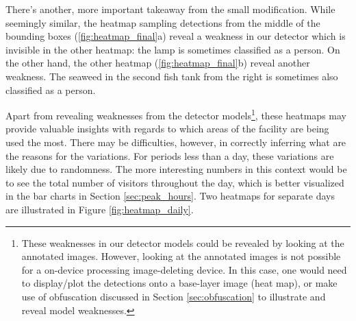 There's another, more important takeaway from the small modification. While seemingly similar, the heatmap sampling detections from the middle of the bounding boxes (\ref{fig:heatmap_final}a) reveal a weakness in our detector which is invisible in the other heatmap: the lamp is sometimes classified as a person. On the other hand, the other heatmap (\ref{fig:heatmap_final}b) reveal another weakness. The seaweed in the second fish tank from the right is sometimes also classified as a person.   

Apart from revealing weaknesses from the detector models\footnote{These weaknesses in our detector models could be revealed by looking at the annotated images. However, looking at the annotated images is not possible for a on-device processing image-deleting device. In this case, one would need to display/plot the detections onto a base-layer image (heat map), or make use of obfuscation discussed in Section \ref{sec:obfuscation} to illustrate and reveal model weaknesses.}, these heatmaps may provide valuable insights with regards to which areas of the facility are being used the most. There may be difficulties, however, in correctly inferring what are the reasons for the variations. For periods less than a day, these variations are likely due to randomness. The more interesting numbers in this context would be to see the total number of visitors throughout the day, which is better visualized in the bar charts in Section \ref{sec:peak_hours}. Two heatmaps for separate days are illustrated in Figure \ref{fig:heatmap_daily}.

